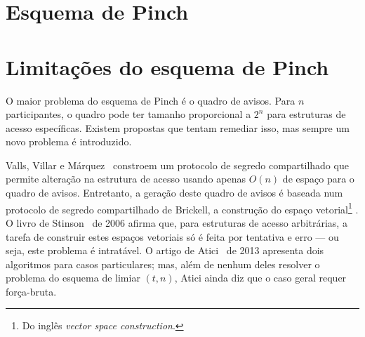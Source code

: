 \documentclass[10pt,twocolumn]{article}
\theoremstyle{definition}
\begin{document}
\section{Esquema de Pinch}
\section{Limitações do esquema de Pinch}

O maior problema do esquema de Pinch é o quadro de avisos.
Para $n$ participantes,
o quadro pode ter tamanho proporcional a $2^n$
para estruturas de acesso específicas.
Existem propostas que tentam remediar isso,
mas sempre um novo problema é introduzido.

Valls, Villar e Márquez~\cite{VallsVillarMarqez1999}
constroem um protocolo de segredo compartilhado
que permite alteração na estrutura de acesso
usando apenas $O(n)$ de espaço para o quadro de avisos.
Entretanto,
a geração deste quadro de avisos é baseada
num protocolo de segredo compartilhado de Brickell,
a construção do espaço vetorial\footnote{
    Do inglês \emph{vector space construction}.
}
\cite{Brickell1990}.
O livro de Stinson~\cite[p.~499]{Stinson2006} de 2006
afirma que, para estruturas de acesso arbitrárias,
a tarefa de construir estes espaços vetoriais
só é feita por tentativa e erro
--- ou seja, este problema é intratável.
O artigo de Atici~\cite{Atici2013} de 2013
apresenta dois algoritmos para casos particulares;
mas, além de nenhum deles resolver o problema do esquema de limiar $(t, n)$,
Atici ainda diz que o caso geral requer força-bruta.



\end{document}
